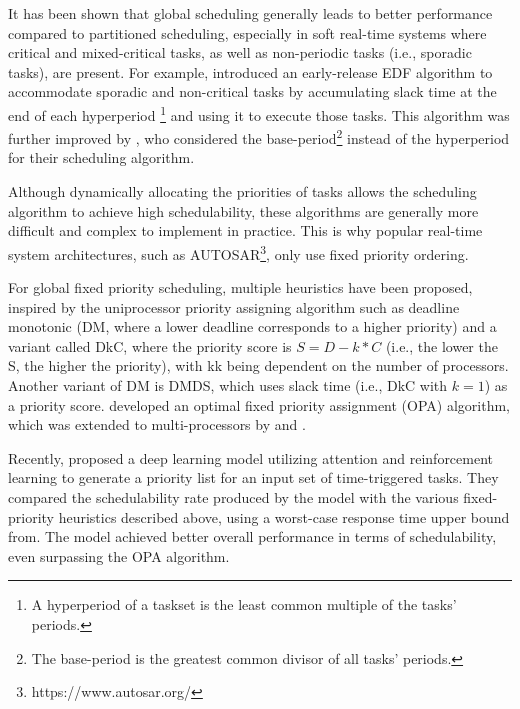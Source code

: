 It has been shown that global scheduling generally leads to 
better performance compared to partitioned scheduling\cite{srinivasan2003globalbetterthanpart}, 
especially in soft real-time systems where critical and mixed-critical tasks, as well 
as non-periodic tasks (i.e., sporadic tasks), are present. For 
example, \cite{matschulat2007EREDF} introduced an early-release EDF 
algorithm to accommodate sporadic and non-critical tasks by 
accumulating slack time at the end of each hyperperiod
\footnote{A hyperperiod of a taskset is the least common multiple of the tasks' periods.} 
and using it to execute those tasks. This algorithm was further 
improved by \cite{yip2014relaxing}, who considered the 
base-period\footnote{The base-period is the greatest common divisor of all tasks' periods.} 
instead of the hyperperiod for their scheduling algorithm.
\newline

Although dynamically allocating the priorities of tasks 
allows the scheduling algorithm to achieve high schedulability, 
these algorithms are generally more difficult and complex to 
implement in practice. This is why popular real-time system 
architectures, such as AUTOSAR\footnote{https://www.autosar.org/}, 
only use fixed priority ordering\cite{panic2014autosar_static}.

For global fixed priority scheduling, multiple heuristics have 
been proposed, inspired by the uniprocessor priority assigning 
algorithm such as deadline monotonic (DM, where a lower deadline 
corresponds to a higher priority) and a variant called DkC, 
where the priority score is $S=D-k*C$ (i.e., the lower the S, 
the higher the priority), with kk being dependent on the number of 
processors\cite{andersson2000DMDkC}. Another variant of DM is 
DMDS\cite{andersson2008DMDS}, which uses slack time (i.e., DkC 
with $k=1$) as a priority score. \cite{audsley2001OPA} developed 
an optimal fixed priority assignment (OPA) algorithm, 
which was extended to multi-processors by \cite{davis2011improvedTDA} 
and \cite{bertogna2008RTA_test}.

Recently, \cite{lee2020panda} proposed a deep learning model 
utilizing attention and reinforcement learning to generate a 
priority list for an input set of time-triggered tasks. They 
compared the schedulability rate produced by the model with the 
various fixed-priority heuristics described above, using a 
worst-case response time upper bound from\cite{bertogna2008RTA_test}. 
The model achieved better overall performance in terms of 
schedulability, even surpassing the OPA algorithm.

